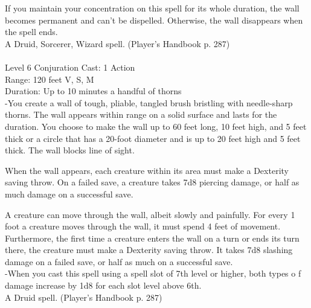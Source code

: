 \documentclass[10pt,twocolumn]{report}
\begin{document}
If you maintain your concentration on this spell for its whole duration, the wall becomes permanent and can’t be dispelled. Otherwise, the wall disappears when the spell ends.\\
A Druid, Sorcerer, Wizard spell. (Player's Handbook p. 287) \\


 \\
Level 6 \quad Conjuration \quad Cast: 1 Action\\
Range: 120 feet \quad V, S, M\\
Duration: Up to 10 minutes \quad a handful of thorns\\
-You create a wall of tough, pliable, tangled brush bristling with needle-sharp thorns. The wall appears within range on a solid surface and lasts for the duration. You choose to make the wall up to 60 feet long, 10 feet high, and 5 feet thick or a circle that has a 20-foot diameter and is up to 20 feet high and 5  feet thick. The wall blocks line of sight.

When the wall appears, each creature within its area must make a Dexterity saving throw. On a failed save, a creature takes 7d8 piercing damage, or half as much damage on a successful save.

A creature can move through the wall, albeit slowly and painfully. For every 1 foot a creature moves through the wall, it must spend 4 feet of movement. Furthermore, the first time a creature enters the wall on a turn or ends its turn there, the creature must make a Dexterity saving throw. It takes 7d8 slashing damage on a failed save, or half as much on a successful save.\\
-When you cast this spell using a spell slot of 7th level or higher, both types o f damage increase by 1d8 for each slot level above 6th.\\
A Druid spell. (Player's Handbook p. 287) \\
\end{document}
